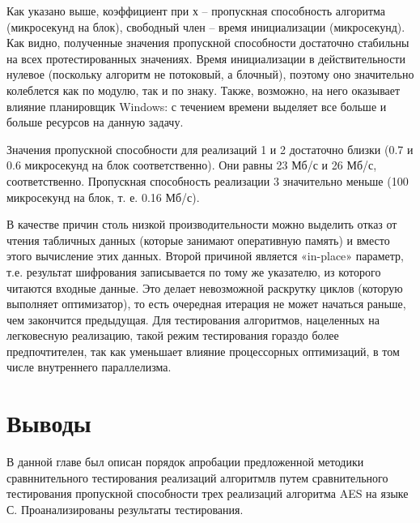 Как указано выше, коэффициент при х – пропускная способность алгоритма (микросекунд на блок), свободный член – время инициализации (микросекунд). Как видно, полученные значения пропускной способности достаточно стабильны на всех протестированных значениях. Время инициализации в действительности нулевое (поскольку алгоритм не потоковый, а блочный), поэтому оно значительно колеблется как по модулю, так и по знаку. Также, возможно, на него оказывает влияние планировщик Windows: с течением времени выделяет все больше и больше ресурсов на данную задачу.

Значения пропускной способности для реализаций 1 и 2 достаточно близки (0.7 и 0.6 микросекунд на блок соответственно). Они равны 23 Мб/с и 26 Мб/с, соответственно. Пропускная способность реализации 3 значительно меньше (100 микросекунд на блок, т. е. 0.16 Мб/с).

В качестве причин столь низкой производительности можно выделить отказ от чтения табличных данных (которые занимают оперативную память) и вместо этого вычисление этих данных. Второй причиной является «in-place» параметр, т.е. результат шифрования записывается по тому же указателю, из которого читаются входные данные. Это делает невозможной раскрутку циклов (которую выполняет оптимизатор), то есть очередная итерация не может начаться раньше, чем закончится предыдущая. Для тестирования алгоритмов, нацеленных на легковесную реализацию, такой режим тестирования гораздо более предпочтителен, так как уменьшает влияние процессорных оптимизаций, в том числе внутреннего параллелизма.

\section{Выводы} \label{ch4:conclusion}

В данной главе был описан порядок апробации предложенной методики сравннительного тестирования реализаций алгоритмлв путем сравнительного тестирования пропускной способности трех реализаций алгоритма AES на языке С. Проанализированы результаты тестирования.

\newpage

%
